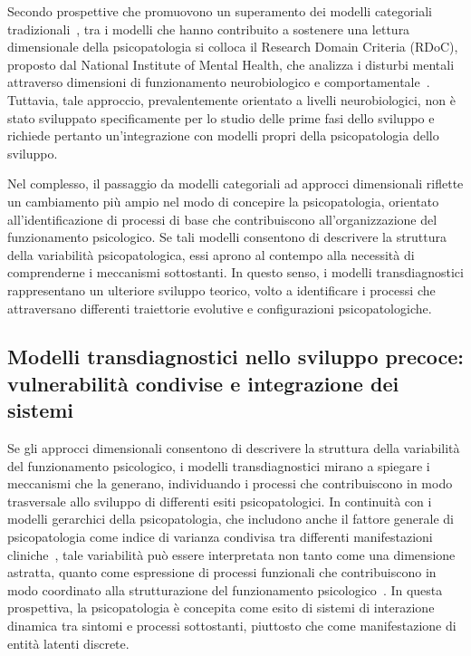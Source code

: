            Secondo prospettive che promuovono un superamento dei modelli categoriali tradizionali~\cite{nolenhoeksema2011}, tra i modelli che hanno contribuito a sostenere una lettura dimensionale della psicopatologia si colloca il Research Domain Criteria (RDoC), proposto dal National Institute of Mental Health, che analizza i disturbi mentali attraverso dimensioni di funzionamento neurobiologico e comportamentale~\cite{cuthbert2013}. Tuttavia, tale approccio, prevalentemente orientato a livelli neurobiologici, non è stato sviluppato specificamente per lo studio delle prime fasi dello sviluppo e richiede pertanto un'integrazione con modelli propri della psicopatologia dello sviluppo.

            Nel complesso, il passaggio da modelli categoriali ad approcci dimensionali riflette un cambiamento più ampio nel modo di concepire la psicopatologia, orientato all'identificazione di processi di base che contribuiscono all'organizzazione del funzionamento psicologico. Se tali modelli consentono di descrivere la struttura della variabilità psicopatologica, essi aprono al contempo alla necessità di comprenderne i meccanismi sottostanti. In questo senso, i modelli transdiagnostici rappresentano un ulteriore sviluppo teorico, volto a identificare i processi che attraversano differenti traiettorie evolutive e configurazioni psicopatologiche.

        \subsection{Modelli transdiagnostici nello sviluppo precoce: vulnerabilità condivise e integrazione dei sistemi}
        \label{sec:2_4_3}

            Se gli approcci dimensionali consentono di descrivere la struttura della variabilità del funzionamento psicologico, i modelli transdiagnostici mirano a spiegare i meccanismi che la generano, individuando i processi che contribuiscono in modo trasversale allo sviluppo di differenti esiti psicopatologici. In continuità con i modelli gerarchici della psicopatologia, che includono anche il fattore generale di psicopatologia come indice di varianza condivisa tra differenti manifestazioni cliniche~\cite{caspi2014,kotov2017}, tale variabilità può essere interpretata non tanto come una dimensione astratta, quanto come espressione di processi funzionali che contribuiscono in modo coordinato alla strutturazione del funzionamento psicologico~\cite{nolenhoeksema2011,dalgleish2020}. In questa prospettiva, la psicopatologia è concepita come esito di sistemi di interazione dinamica tra sintomi e processi sottostanti, piuttosto che come manifestazione di entità latenti discrete.

